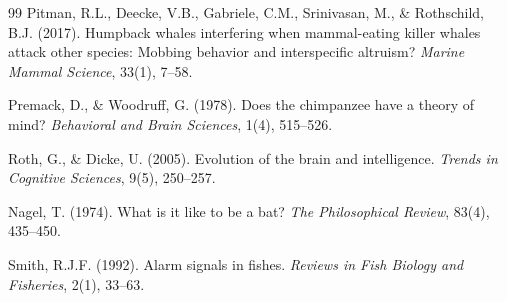 ﻿\documentclass[12pt,a4paper]{article}
\theoremstyle{definition}
\theoremstyle{remark}
\begin{document}
\begin{thebibliography}{99}
Pitman, R.L., Deecke, V.B., Gabriele, C.M., Srinivasan, M., \& Rothschild, B.J. (2017).
Humpback whales interfering when mammal-eating killer whales attack other species: Mobbing behavior and interspecific altruism?
\textit{Marine Mammal Science}, 33(1), 7--58.

Premack, D., \& Woodruff, G. (1978).
Does the chimpanzee have a theory of mind?
\textit{Behavioral and Brain Sciences}, 1(4), 515--526.

Roth, G., \& Dicke, U. (2005).
Evolution of the brain and intelligence.
\textit{Trends in Cognitive Sciences}, 9(5), 250--257.

Nagel, T. (1974).
What is it like to be a bat?
\textit{The Philosophical Review}, 83(4), 435--450.

Smith, R.J.F. (1992).
Alarm signals in fishes.
\textit{Reviews in Fish Biology and Fisheries}, 2(1), 33--63.

\end{thebibliography}
\end{document}
